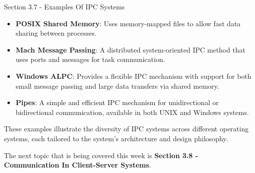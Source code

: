 \begin{notes}{Section 3.7 - Examples Of IPC Systems}
\begin{highlight}
        \begin{itemize}
            \item \textbf{POSIX Shared Memory}: Uses memory-mapped files to allow fast data sharing between processes.
            \item \textbf{Mach Message Passing}: A distributed system-oriented IPC method that uses ports and messages for task communication.
            \item \textbf{Windows ALPC}: Provides a flexible IPC mechanism with support for both small message passing and large data transfers via shared memory.
            \item \textbf{Pipes}: A simple and efficient IPC mechanism for unidirectional or bidirectional communication, available in both UNIX and Windows systems.
        \end{itemize}
    
    These examples illustrate the diversity of IPC systems across different operating systems, each tailored to the system's architecture and design philosophy.
    
    \end{highlight}
\end{notes}

The next topic that is being covered this week is \textbf{Section 3.8 - Communication In Client-Server Systems}.

